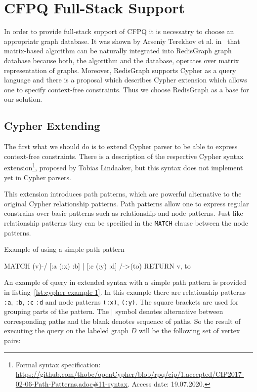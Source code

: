 \section{CFPQ Full-Stack Support}

In order to provide full-stack support of CFPQ it is necessatry to choose an appropriatr graph database.
It was shown by Arseniy Terekhov et al. in~\cite{10.1145/3398682.3399163} that matrix-based algorithm can be naturally integrated into RedisGraph graph database because both, the algorithm and the database, operates over matrix representation of graphs.
Moreover, RedisGraph supports Cypher as a query language and there is a proposal which describes Cypher extension which allows one to specify context-free constraints.
Thus we choose RedisGraph as a base for our solution.  


\subsection{Cypher Extending}
\label{subsec:cypher-extension}

The first what we should do is to extend Cypher parser to be able to express context-free constraints.
There is a description of the respective Cypher syntax extension\footnote{\label{cypher-proposal}Formal syntax specification: \url{https://github.com/thobe/openCypher/blob/rpq/cip/1.accepted/CIP2017-02-06-Path-Patterns.adoc\#11-syntax}. Access date: 19.07.2020.}, proposed by Tobias Lindaaker, but this syntax does not implement yet in Cypher parsers.

This extension introduces path patterns, which are powerful alternative to the original Cypher relationship patterns.
Path patterns allow one to express regular constrains over basic patterns such as relationship and node patterns.
Just like relationship patterns they can be specified in the \texttt{MATCH} clause between the node patterns.

\begin{algorithm}
\begin{algorithmic}[1]
\caption{Example of using a simple path pattern}
\label{lst:cypher-example-1}
\State MATCH (v)-/ [:a (:x) :b] | [:c (:y) :d] /->(to)
\State RETURN v, to
\end{algorithmic}
\end{algorithm}

An example of query in extended syntax with a simple path pattern is provided in listing~\ref{lst:cypher-example-1}.
In this example there are relationship patterns \lstinline{:a}, \lstinline{:b}, \lstinline{:c} \lstinline{:d} and node patterns \lstinline{(:x)}, \lstinline{(:y)}.
The square brackets are used for grouping parts of the pattern.
The $|$ symbol denotes alternative between corresponding paths and the blank denotes sequence of paths. So the result of executing the query on the labeled graph $D$ will be the following set of vertex pairs:

